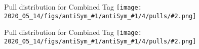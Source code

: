 
\newcommand{\pull}[3]{
\begin{frame}{Pull distribution for #3}
\texttt{[image: 2020\_05\_14/figs/antiSym\_\#1/antiSym\_\#1/4/pulls/\#2.png]}
\end{frame}

}

\pull{chebyshev}{Comb}{Combined Tag}
\pull{simple}{Comb}{Combined Tag}
